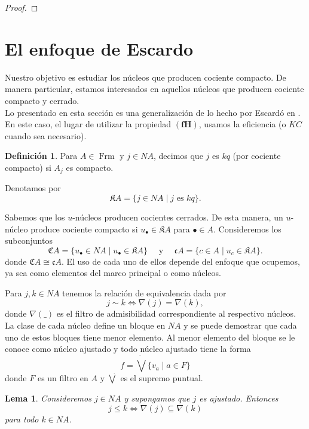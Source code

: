 \documentclass[11pt]{amsart}
\DeclareMathOperator{\Frm}{Frm}
\theoremstyle{plain}
\newtheorem{lem}[thm]{Lema}
\theoremstyle{definition}
\newtheorem{dfn}[thm]{Definición}
\begin{document}
\begin{proof}

\end{proof}
\section{El enfoque de Escardo}
\cite{escardo2001regular} \cite{escardo2006compactly}
Nuestro objetivo es estudiar los núcleos que producen cociente compacto. De manera particular, estamos interesados en 
aquellos núcleos que producen cociente compacto y cerrado.\\

Lo presentado en esta sección es una generalización de lo hecho por Escardó en \cite{escardo2006compactly}. En este caso, el lugar de utilizar la propiedad
$\mathbf{(fH)}$, usamos la eficiencia (o $KC$ cuando sea necesario).

\begin{dfn}\label{Definicion2.1}
Para $A\in \Frm$ y $j\in NA$, decimos que $j$ es $kq$ (por cociente compacto) si $A_j$ es compacto.  
\end{dfn}

Denotamos por 
\[
\mathfrak{K}A=\{j\in NA\mid j \mbox{ es } kq\}.
\]

Sabemos que los $u$-núcleos producen cocientes cerrados. De esta manera, un $u$-núcleo produce cociente compacto si $u_{\bullet}\in \mathfrak{K}A$ para $\bullet\in A$. Consideremos los subconjuntos
\[
\mathfrak{C}A=\{u_\bullet\in NA\mid u_\bullet\in \mathfrak{K}A\}\quad \mbox{ y }\quad \mathfrak{c}A=\{c\in A\mid u_c\in \mathfrak{K}A\}.
\]
donde $\mathfrak{C}A\cong \mathfrak{c}A$. El uso de cada uno de ellos depende del enfoque que ocupemos, ya sea como elementos del marco principal o como núcleos.

Para $j, k\in NA$ tenemos la relación de equivalencia dada por 
\[
j\sim k \Leftrightarrow \nabla(j)=\nabla(k),
\]
donde $\nabla( \_ )$ es el filtro de admisibilidad correspondiente al respectivo núcleos.\\

La clase de cada núcleo define un bloque en $NA$ y se puede demostrar que cada uno de estos bloques tiene menor elemento. Al menor elemento del bloque se le conoce como núcleo ajustado y todo núcleo ajustado tiene la forma
\[
f=\dot\bigvee \{v_a\mid a\in F\}
\]
donde $F$ es un filtro en $A$ y $\dot{\bigvee}$ es el supremo puntual.

\begin{lem}\label{cn ajustado}
    Consideremos $j\in NA$ y supongamos que $j$ es ajustado. Entonces
    \[
    j\leq k\Leftrightarrow \nabla(j)\subseteq \nabla(k)
    \]
    para todo $k\in NA$.
\end{lem}
\end{document}
